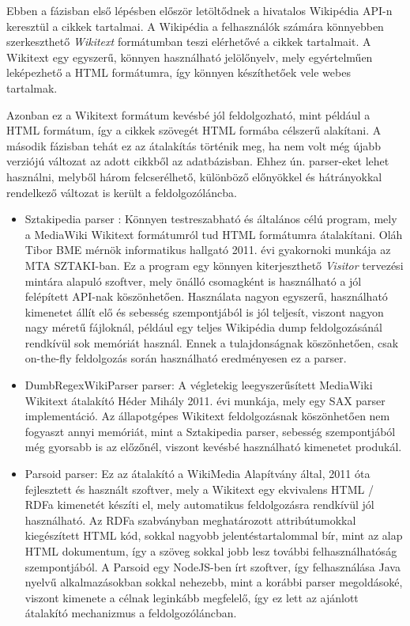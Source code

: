 Ebben a fázisban első lépésben először letöltődnek a hivatalos Wikipédia API-n keresztül a cikkek tartalmai. A Wikipédia a felhasználók számára könnyebben szerkeszthető \textit{Wikitext} formátumban teszi elérhetővé a cikkek tartalmait. A Wikitext egy egyszerű, könnyen használható jelölőnyelv, mely egyértelműen leképezhető a HTML formátumra, így könnyen készíthetőek vele webes tartalmak.

Azonban ez a Wikitext formátum kevésbé jól feldolgozható, mint például a HTML formátum, így a cikkek szövegét HTML formába célszerű alakítani. A második fázisban tehát ez az átalakítás történik meg, ha nem volt még újabb verziójú változat az adott cikkből az adatbázisban. Ehhez ún. parser-eket lehet használni, melyből három felcserélhető, különböző előnyökkel és hátrányokkal rendelkező változat is került a feldolgozóláncba.

\begin{itemize}
	\item Sztakipedia parser \cite{sztakipediaparser}: Könnyen testreszabható és általános célú program, mely a MediaWiki Wikitext formátumról tud HTML formátumra átalakítani. Oláh Tibor BME mérnök informatikus hallgató 2011. évi gyakornoki munkája az MTA SZTAKI-ban. Ez a program egy könnyen kiterjeszthető \textit{Visitor} tervezési mintára alapuló szoftver, mely önálló csomagként is használható a jól felépített API-nak köszönhetően. Használata nagyon egyszerű, használható kimenetet állít elő és sebesség szempontjából is jól teljesít, viszont nagyon nagy méretű fájloknál, például egy teljes Wikipédia dump feldolgozásánál rendkívül sok memóriát használ. Ennek a tulajdonságnak köszönhetően, csak on-the-fly feldolgozás során használható eredményesen ez a parser.
	
	\item DumbRegexWikiParser parser: A végletekig leegyszerűsített MediaWiki Wikitext átalakító Héder Mihály 2011. évi munkája, mely egy SAX parser implementáció. Az állapotgépes Wikitext feldolgozásnak köszönhetően nem fogyaszt annyi memóriát, mint a Sztakipedia parser, sebesség szempontjából még gyorsabb is az előzőnél, viszont kevésbé használható kimenetet produkál.
	
	\item Parsoid parser: Ez az átalakító a WikiMedia Alapítvány által, 2011 óta fejlesztett és használt szoftver, mely a Wikitext egy ekvivalens HTML / RDFa kimenetét készíti el, mely automatikus feldolgozásra rendkívül jól használható. Az RDFa szabványban meghatározott attribútumokkal kiegészített HTML kód, sokkal nagyobb jelentéstartalommal bír, mint az alap HTML dokumentum, így a szöveg sokkal jobb lesz további felhasználhatóság szempontjából. A Parsoid egy NodeJS-ben írt szoftver, így felhasználása Java nyelvű alkalmazásokban sokkal nehezebb, mint a korábbi parser megoldásoké, viszont kimenete a célnak leginkább megfelelő, így ez lett az ajánlott átalakító mechanizmus a feldolgozóláncban.
\end{itemize}

